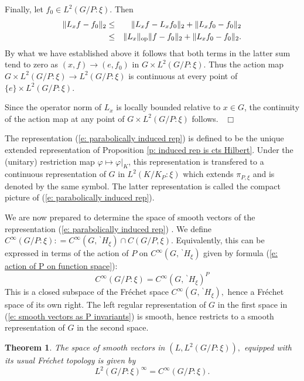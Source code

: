 \documentclass[12pt,a4paper]{article}
\newtheorem{Thm}{Theorem}
\newenvironment{thm}[0]{\begin{Thm}\noindent}%
{\end{Thm}}
\def\qed{~\hfill\hbox{$\Box$}\medbreak}
\def\gf{\varphi}
\def\to{\rightarrow}
\numberwithin{Thm}{section}
\numberwithin{equation}{section}
\numberwithin{equation}{section}
\def\bp{\!{\,}^\backprime}
\begin{document}
Finally, let  $f_0 \in L^2(G/P:\xi).$ 
Then 
\begin{eqnarray*} 
\|L_x f -  f_0 \|_2 & \leq &\|L_x f - L_x f_0 \|_2 + \|L_x f_0 - f_0\|_2 \\
& \leq & \|L_x\|_{\rm op} \|f -f_0\|_2+ \|L_x  f_0 - f_0\|_2.
\end{eqnarray*}
By what we have established above it follows that both terms in the latter sum 
tend to zero as $(x, f) \to (e, f_0)$ in $G \times L^2(G/P:\xi).$ 
Thus the action map $G \times L^2(G/P:\xi)  \to L^2(G/P:\xi)$ is continuous at every point of $\{e\} \times L^2(G/P:\xi).$ 

Since the operator norm of $L_x$ is locally bounded relative to $x\in G$, the continuity
of the action map at any point of $G \times L^2(G/P:\xi)$ follows.
\qed
 
The representation (\ref{e: parabolically induced rep}) is defined to be the unique extended representation of Proposition \ref{p: induced rep is cts Hilbert}. Under the (unitary) restriction map $\gf \mapsto \gf|_{K}$, this 
representation is transfered to a continuous representation of $G$ in  $L^2(K/K_P:\xi)$ 
which extends $\pi_{P,\xi}$ and is denoted by the same symbol. The latter representation  is called
the compact picture of (\ref{e: parabolically induced rep}).
\medbreak

We are now prepared to determine the space of smooth vectors of the representation
(\ref{e: parabolically induced rep}) . 
We define $C^\infty(G/P:\xi): = C^\infty(G, \bp H_\xi)  \cap C(G/P, \xi).$
Equivalently, this can be expressed in terms of the  action of $P$ on $C^\infty(G, \bp H_\xi)$ given by formula (\ref{e: action of P on function space}): 
\begin{equation}
\label{e: smooth vectors as P invariants}
C^\infty(G/P:\xi) = C^\infty(G, \bp H_\xi)^P
\end{equation}
This is a closed subspace of the Fr\'echet space $C^\infty(G, \bp H_\xi),$ 
hence a Fr\'echet space of its own right. The left regular representation
of $G$ in the first space in (\ref{e: smooth vectors as P invariants}) is smooth, hence restricts to a smooth representation of $G$ in the second space.

\begin{thm}
\label{t: identification of smooth vectors}
The space of smooth vectors in $(L, L^2(G/P:\xi)),$ equipped with its usual 
Fr\'echet topology is given by 
\begin{equation}
\label{e: space of smooth vectors} 
L^2(G/P:\xi)^\infty = C^\infty(G/P:\xi).
\end{equation}
\end{thm}
\end{document}
